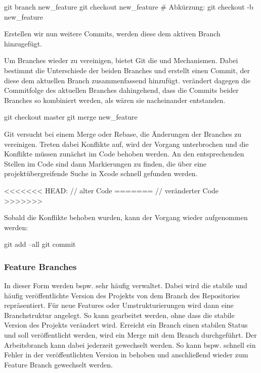 \documentclass[parskip=half, final]{scrreprt}
\begin{document}
\begin{shlst}
git branch new_feature
git checkout new_feature
# Abkürzung:
git checkout -b new_feature
\end{shlst}

Erstellen wir nun weitere Commits, werden diese dem aktiven Branch hinzugefügt. 

Um Branches wieder zu vereinigen, bietet Git die  und  Mechanismen. Dabei bestimmt  die Unterschiede der beiden Branches und erstellt einen Commit, der diese dem aktuellen Branch zusammenfassend hinzufügt.  verändert dagegen die Commitfolge des aktuellen Branches dahingehend, dass die Commits beider Branches so kombiniert werden, als wären sie nacheinander entstanden.

\begin{shlst}
git checkout master
git merge new_feature
\end{shlst}

Git versucht bei einem Merge oder Rebase, die Änderungen der Branches zu vereinigen. Treten dabei Konflikte auf, wird der Vorgang unterbrochen und die Konflikte müssen zunächst im Code behoben werden. An den entsprechenden Stellen im Code sind dann Markierungen zu finden, die über eine projektübergreifende Suche in Xcode schnell gefunden werden.

\begin{objclst}
<<<<<<< HEAD:
// alter Code
=======
// veränderter Code
>>>>>>>
\end{objclst}

Sobald die Konflikte behoben wurden, kann der Vorgang wieder aufgenommen werden:

\begin{shlst}
git add --all
git commit
\end{shlst}

\subsubsection{Feature Branches}

In dieser Form werden bspw. sehr häufig  verwaltet. Dabei wird die stabile und häufig veröffentlichte Version des Projekts von dem  Branch des Repositories repräsentiert. Für neue Features oder Umstrukturierungen wird dann eine Branchstruktur angelegt. So kann gearbeitet werden, ohne dass die stabile Version des Projekts verändert wird. Erreicht ein Branch einen stabilen Status und soll veröffentlicht werden, wird ein Merge mit dem  Branch durchgeführt. Der Arbeitsbranch kann dabei jederzeit gewechselt werden. So kann bspw. schnell ein Fehler in der veröffentlichten Version in  behoben und anschließend wieder zum Feature Branch gewechselt werden.
\end{document}
